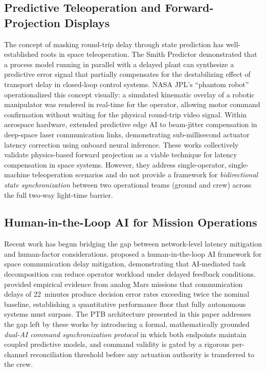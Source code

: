 \documentclass[ASNA,twocolumn]{USG}
\begin{document}
\subsection{Predictive Teleoperation and Forward-Projection Displays}
The concept of masking round-trip delay through state prediction has well-established roots
in space teleoperation. The Smith Predictor \cite{sheridan1993} demonstrated that a
process model running in parallel with a delayed plant can synthesize a predictive error
signal that partially compensates for the destabilizing effect of transport delay in closed-loop
control systems. NASA JPL's ``phantom robot'' \cite{bejczy1990} operationalized this
concept visually: a simulated kinematic overlay of a robotic manipulator was rendered in
real-time for the operator, allowing motor command confirmation without waiting for the
physical round-trip video signal. Within aerospace hardware, \cite{acceleron2024} extended
predictive edge AI to beam-jitter compensation in deep-space laser communication links,
demonstrating sub-millisecond actuator latency correction using onboard neural inference.
These works collectively validate physics-based forward projection as a viable technique
for latency compensation in space systems. However, they address single-operator,
single-machine teleoperation scenarios and do not provide a framework for
\textit{bidirectional state synchronization} between two operational teams (ground and crew)
across the full two-way light-time barrier.

\subsection{Human-in-the-Loop AI for Mission Operations}
Recent work has begun bridging the gap between network-level latency mitigation and
human-factor considerations. \cite{mavrakis2025} proposed a human-in-the-loop AI framework
for space communication delay mitigation, demonstrating that AI-mediated task decomposition
can reduce operator workload under delayed feedback conditions. \cite{diamond2025} provided
empirical evidence from analog Mars missions that communication delays of 22~minutes produce
decision error rates exceeding twice the nominal baseline, establishing a quantitative
performance floor that fully autonomous systems must surpass. The PTB architecture presented
in this paper addresses the gap left by these works by introducing a formal, mathematically
grounded \textit{dual-AI command synchronization protocol} in which both endpoints maintain
coupled predictive models, and command validity is gated by a rigorous per-channel
reconciliation threshold before any actuation authority is transferred to the crew.
\end{document}
